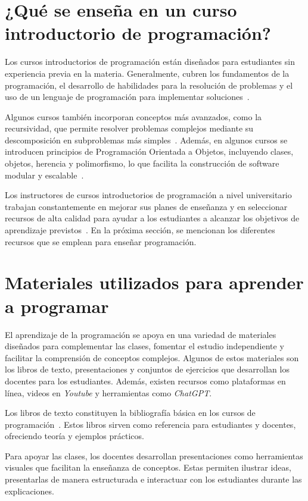 \section{¿Qué se enseña en un curso introductorio de programación?}\label{sec:contents}

Los cursos introductorios de programación están diseñados para estudiantes sin experiencia previa en la materia. Generalmente, cubren los fundamentos de la programación, el desarrollo de habilidades para la resolución de problemas y el uso de un lenguaje de programación para implementar soluciones~\cite{Medeiros2019}.

Algunos cursos también incorporan conceptos más avanzados, como la recursividad, que permite resolver problemas complejos mediante su descomposición en subproblemas más simples~\cite{cs50_harvard,mit_60001}. Además, en algunos cursos se introducen principios de Programación Orientada a Objetos, incluyendo clases, objetos, herencia y polimorfismo, lo que facilita la construcción de software modular y escalable~\cite{cs50_harvard, mit_60001}.

Los instructores de cursos introductorios de programación a nivel universitario trabajan constantemente en mejorar sus planes de enseñanza y en seleccionar recursos de alta calidad para ayudar a los estudiantes a alcanzar los objetivos de aprendizaje previstos~\cite{NAS2018}. En la próxima sección, se mencionan los diferentes recursos que se emplean para enseñar programación.

\section{Materiales utilizados para aprender a programar}\label{sec:resources}

El aprendizaje de la programación se apoya en una variedad de materiales diseñados para complementar las clases, fomentar el estudio independiente y facilitar la comprensión de conceptos complejos. Algunos de estos materiales son los libros de texto, presentaciones y conjuntos de ejercicios que desarrollan los docentes para los estudiantes. Además, existen recursos como plataformas en línea, videos en \textit{Youtube} y herramientas como \textit{ChatGPT}.

Los libros de texto constituyen la bibliografía básica en los cursos de programación~\cite{wong2022}. Estos libros sirven como referencia para estudiantes y docentes, ofreciendo teoría y ejemplos prácticos.

Para apoyar las clases, los docentes desarrollan presentaciones como herramientas visuales que facilitan la enseñanza de conceptos. Estas permiten ilustrar ideas, presentarlas de manera estructurada e interactuar con los estudiantes durante las explicaciones.

